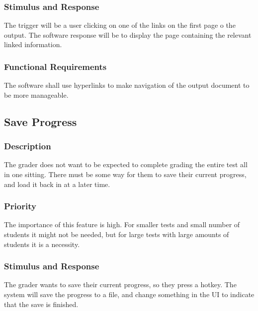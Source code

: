\subsubsection{Stimulus and Response}
The trigger will be a user clicking on one of the links on the first page o the output. The software response will be to display the page containing the relevant linked information.

\subsubsection{Functional Requirements}
The software shall use hyperlinks to make navigation of the output document to be more manageable.


\subsection{Save Progress}
\subsubsection{Description}
The grader does not want to be expected to complete grading the entire test all in one sitting. There must be some way for them to save their current progress, and load it back in at a later time.

\subsubsection{Priority}
The importance of this feature is high. For smaller tests and small number of students it might not be needed, but for large tests with large amounts of students it is a necessity.

\subsubsection{Stimulus and Response}
The grader wants to save their current progress, so they press a hotkey. The system will save the progress to a file, and change something in the UI to indicate that the save is finished.

